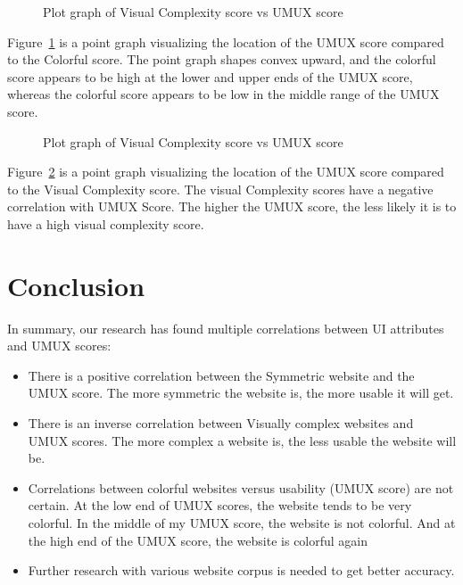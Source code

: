 \documentclass[conference]{IEEEtran}
\begin{document}
\begin{figure}[!ht]
    \centering
    \scalebox{0.57}{
        
    }
    \caption{Plot graph of Visual Complexity score vs UMUX score}
    \label{fig:colorfulumux}
\end{figure}

Figure~\ref{fig:colorfulumux} is a point graph visualizing the location of the UMUX score compared to the Colorful score. The point graph shapes convex upward, and the colorful score appears to be high at the lower and upper ends of the UMUX score, whereas the colorful score appears to be low in the middle range of the UMUX score.

\begin{figure}[!ht]
    \centering
    \scalebox{0.57}{
        
    }
    \caption{Plot graph of Visual Complexity score vs UMUX score}
    \label{fig:viscomplexumux}
\end{figure}

Figure~\ref{fig:viscomplexumux} is a point graph visualizing the location of the UMUX score compared to the Visual Complexity score. The visual Complexity scores have a negative correlation with UMUX Score. The higher the UMUX score, the less likely it is to have a high visual complexity score.

\section{Conclusion}

In summary, our research has found multiple correlations between UI attributes and UMUX scores:

\begin{itemize}
    \item There is a positive correlation between the Symmetric website and the UMUX score. The more symmetric the website is, the more usable it will get.
    \item There is an inverse correlation between Visually complex websites and UMUX scores. The more complex a website is, the less usable the website will be.
    \item Correlations between colorful websites versus usability (UMUX score) are not certain. At the low end of UMUX scores, the website tends to be very colorful. In the middle of my UMUX score, the website is not colorful. And at the high end of the UMUX score, the website is colorful again
    \item Further research with various website corpus is needed to get better accuracy.
\end{itemize}
\end{document}
